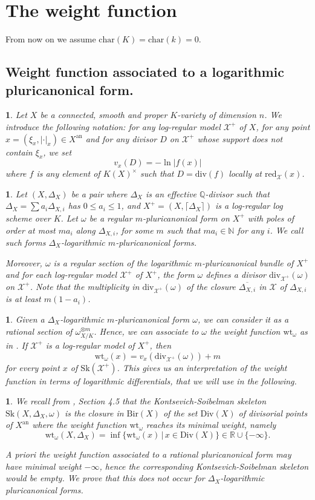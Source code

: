 \documentclass{amsart}%
\numberwithin{equation}{subsection}
\theoremstyle{plain2}
\theoremstyle{definition2}
\theoremstyle{stepstyle}
\theoremstyle{point}
\theoremstyle{subpoint}
\newtheorem{subpoint}[equation]{}%
\newcommand{\spa}[1]{\begin{subpoint}#1\end{subpoint}}           %
\newcommand{\N}{\ensuremath{\mathbb{N}}}
\newcommand{\Q}{\ensuremath{\mathbb{Q}}}
\newcommand{\R}{\ensuremath{\mathbb{R}}}
\newcommand{\cX}{\ensuremath{\mathscr{X}}}
\renewcommand{\R}{\ensuremath{\mathbb{R}}}
\newcommand{\redu}{\mathrm{red}}
\newcommand{\an}{\mathrm{an}}
\newcommand{\divisor}{\mathrm{div}}
\newcommand{\weight}{\mathrm{wt}}
\newcommand{\Sk}{\mathrm{Sk}}
\begin{document}
\section{The weight function}\label{sec weight}
From now on we assume $\text{char}(K)=\text{char}(k)=0$.
\subsection{Weight function associated to a logarithmic pluricanonical form.}
\spa{Let $X$ be a connected, smooth and proper $K$-variety of dimension $n$. We introduce the following notation: for any log-regular model $\cX^+$ of $X$, for any point $x = (\xi_x,|\cdot|_x) \in X^\an$ and for any divisor $D$ on $\cX^+$ whose support does not contain $\xi_x$, we set $$v_x(D) = - \ln |f(x)|$$ where $f$ is any element of $K(X)^\times$ such that $D= \divisor(f)$ locally at $\redu_{\cX}(x)$.}

\spa{Let $(X,\Delta_X)$ be a pair where $\Delta_X$ is an effective $\Q$-divisor such that $\Delta_X= \sum a_i \Delta_{X,i}$ has $0 \leqslant a_i \leqslant 1$, and  $X^+=(X,\lceil \Delta_X \rceil)$ is a log-regular log scheme over $K$. Let $\omega$ be a regular $m$-pluricanonical form on $X^+$ with poles of order at most $ma_i$ along $\Delta_{X,i}$, for some $m$ such that $ma_i \in \N$ for any $i$. We call such forms $\Delta_X$-logarithmic $m$-pluricanonical forms.

Moreover, $\omega$ is a regular section of the logarithmic $m$-pluricanonical bundle of $X^+$ and for each log-regular model $\cX^+$ of $X^+$, the form $\omega$ defines a divisor $\divisor_{\cX^+}(\omega)$ on $\cX^+$. Note that the multiplicity in $\divisor_{\cX^+}(\omega)$ of the closure $\overline{\Delta_{X,i}}$ in $\cX$ of $\Delta_{X,i}$ is at least $m(1-a_i)$.
}

\spa{Given a $\Delta_X$-logarithmic $m$-pluricanonical form $\omega$, we can consider it as a rational section of $\omega_{X/K}^{\otimes m}$. Hence, we can associate to $\omega$ the weight function $\weight_{\omega}$ as in \cite{MustataNicaise}. If $\cX^+$ is a log-regular model of $X^+$, then $$\weight_{\omega}(x) = v_x(\divisor_{\cX^+}(\omega)) +m $$ for every point $x$ of $\Sk(\cX^+)$. This gives us an interpretation of the weight function in terms of logarithmic differentials, that we will use in the following. }

\spa{We recall from \cite{MustataNicaise}, Section 4.5 that the Kontsevich-Soibelman skeleton $\Sk(X, \Delta_X, \omega)$ is the closure in $\text{Bir}(X)$ of the set $\text{Div}(X) $ of divisorial points of $X^\text{an}$ where the weight function $\weight_\omega$ reaches its minimal weight, namely $$\weight_{\omega}(X, \Delta_X) = \inf \{ \weight_{\omega}(x) \,| \, x \in \text{Div}(X) \} \in \R \cup \{ -\infty\}.$$

A priori the weight function associated to a rational pluricanonical form may have minimal weight $-\infty$, hence the corresponding Kontsevich-Soibelman skeleton would be empty. We prove that this does not occur for $\Delta_X$-logarithmic pluricanonical forms.
}
\end{document}
